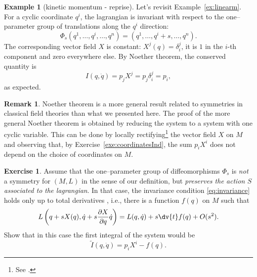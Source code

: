 \documentclass[english,fontsize=11pt,paper=b5]{scrbook}
\theoremstyle{definition}
\newtheorem{remark}{Remark}[chapter]
\newtheorem{example}{Example}[chapter]
\newtheorem{exercise}{Exercise}[chapter]
\begin{document}
    \begin{example}[kinetic momentum - reprise]\label{exa:kmom}
      Let's revisit Example~\ref{ex:linearm}.
      For a cyclic coordinate $q^i$, the lagrangian is invariant with respect to the one--parameter group of translations along the $q^i$ direction:
      \begin{equation}
        \Phi_s(q^1, \ldots, q^i, \ldots, q^n) = (q^1, \ldots, q^i + s, \ldots, q^n).
      \end{equation}
      The corresponding vector field $X$ is constant: $X^j(q) = \delta^j_i$, it is $1$ in the $i$-th component and zero everywhere else.
      By Noether theorem, the conserved quantity is
      \begin{equation}
        I(q,\dot q) = p_j X^j = p_j \delta^j_i = p_i,
      \end{equation}
      as expected.
    \end{example}

    \begin{remark}
      Noether theorem is a more general result related to symmetries in classical field theories than what we presented here.
      The proof of the more general Noether theorem is obtained by reducing the system to a system with one cyclic variable.
      This can be done by locally rectifying\footnote{See \cite[Chapter 3.5]{lectures:aom:seri}.} the vector field $X$ on $M$ and
      observing that, by Exercise~\ref{exe:coordinatesInd}, the sum $p_i X^i$ does not depend on the choice of coordinates on $M$.
    \end{remark}

    \begin{exercise}
      Assume that the one--parameter group of diffeomorphisms $\Phi_s$ is \emph{not} a symmetry for $(M,L)$ in the sense of our definition, but \emph{preserves the action $S$ associated to the lagrangian}.
      In that case, the invariance condition \eqref{eq:invariance} holds only up to total derivatives \cite[Chapter 4.20]{book:gelfand}, i.e., there is a function $f(q)$ on $M$ such that
      \begin{equation}
        L\left( q + s X(q), \dot q + s \frac{\partial X}{\partial q} \dot q\right)
        = L(q, \dot q) + s \dv{t}f(q) + O(s^2).
      \end{equation}
      Show that in this case the first integral of the system would be
      \begin{equation}
        \widetilde I(q, \dot q) = p_i X^i - f(q).
      \end{equation}
    \end{exercise}
\end{document}

